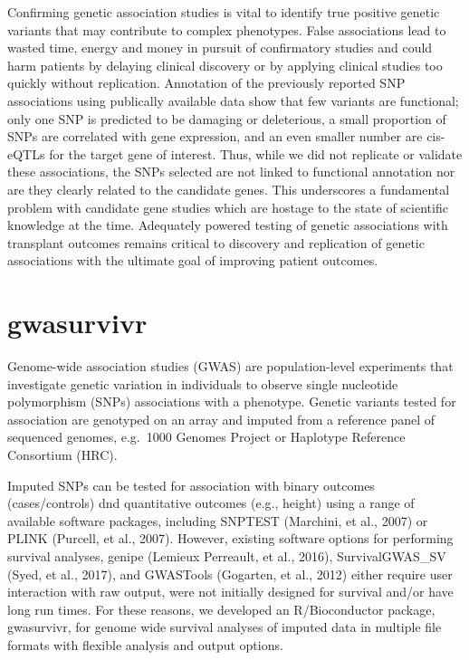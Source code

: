 \documentclass[]{DissertateUSU}
\begin{document}
Confirming genetic association studies is vital to identify true
positive genetic variants that may contribute to complex phenotypes.
False associations lead to wasted time, energy and money in pursuit of
confirmatory studies and could harm patients by delaying clinical
discovery or by applying clinical studies too quickly without
replication. Annotation of the previously reported SNP associations
using publically available data show that few variants are functional;
only one SNP is predicted to be damaging or deleterious, a small
proportion of SNPs are correlated with gene expression, and an even
smaller number are cis-eQTLs for the target gene of interest. Thus,
while we did not replicate or validate these associations, the SNPs
selected are not linked to functional annotation nor are they clearly
related to the candidate genes. This underscores a fundamental problem
with candidate gene studies which are hostage to the state of scientific
knowledge at the time. Adequately powered testing of genetic
associations with transplant outcomes remains critical to discovery and
replication of genetic associations with the ultimate goal of improving
patient outcomes.

\FloatBarrier

\newpage

\pagestyle{plain} \fancyhead[L]{} \fancyhead[R]{}
\fancyfoot[C]{\thepage}

\chapter{gwasurvivr}

Genome-wide association studies (GWAS) are population-level experiments
that investigate genetic variation in individuals to observe single
nucleotide polymorphism (SNPs) associations with a phenotype. Genetic
variants tested for association are genotyped on an array and imputed
from a reference panel of sequenced genomes, e.g.~1000 Genomes Project
or Haplotype Reference Consortium (HRC).

Imputed SNPs can be tested for association with binary outcomes
(cases/controls) dnd quantitative outcomes (e.g., height) using a range
of available software packages, including SNPTEST (Marchini, et al.,
2007) or PLINK (Purcell, et al., 2007). However, existing software
options for performing survival analyses, genipe (Lemieux Perreault, et
al., 2016), SurvivalGWAS\_SV (Syed, et al., 2017), and GWASTools
(Gogarten, et al., 2012) either require user interaction with raw
output, were not initially designed for survival and/or have long run
times. For these reasons, we developed an R/Bioconductor package,
gwasurvivr, for genome wide survival analyses of imputed data in
multiple file formats with flexible analysis and output options.
\end{document}
